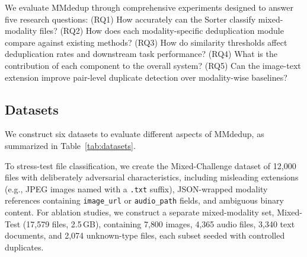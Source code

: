 \documentclass[conference]{IEEEtran}
\renewcommand{\arraystretch}{1.15}
\begin{document}
We evaluate MMdedup through comprehensive experiments designed to answer five research questions: (RQ1) How accurately can the Sorter classify mixed-modality files? (RQ2) How does each modality-specific deduplication module compare against existing methods? (RQ3) How do similarity thresholds affect deduplication rates and downstream task performance? (RQ4) What is the contribution of each component to the overall system? (RQ5) Can the image-text extension improve pair-level duplicate detection over modality-wise baselines?

\subsection{Datasets}

We construct six datasets to evaluate different aspects of MMdedup, as summarized in Table~\ref{tab:datasets}.

\begin{table}[t]
\caption{Summary of evaluation datasets.}
\label{tab:datasets}
\centering
\small
\setlength{\tabcolsep}{4pt}
\renewcommand{\arraystretch}{1.15}
\end{table}

To stress-test file classification, we create the Mixed-Challenge dataset of 12{,}000 files with deliberately adversarial characteristics, including misleading extensions (e.g., JPEG images named with a \texttt{.txt} suffix), JSON-wrapped modality references containing \texttt{image\_url} or \texttt{audio\_path} fields, and ambiguous binary content. For ablation studies, we construct a separate mixed-modality set, Mixed-Test (17{,}579 files, 2.5\,GB), containing 7{,}800 images, 4{,}365 audio files, 3{,}340 text documents, and 2{,}074 unknown-type files, each subset seeded with controlled duplicates.
\end{document}
